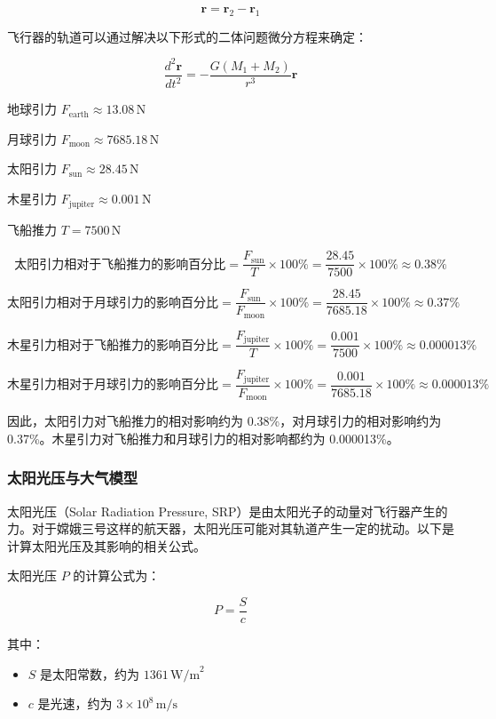 \documentclass{ctexart}
\begin{document}
\[
\mathbf{r} = \mathbf{r}_2 - \mathbf{r}_1
\]

飞行器的轨道可以通过解决以下形式的二体问题微分方程来确定：

\[
\frac{d^2 \mathbf{r}}{dt^2} = -\frac{G (M_1 + M_2)}{r^3} \mathbf{r}
\]

地球引力 \( F_{\text{earth}} \approx 13.08 \, \text{N} \)

月球引力 \( F_{\text{moon}} \approx 7685.18 \, \text{N} \)

太阳引力 \( F_{\text{sun}} \approx 28.45 \, \text{N} \)

木星引力 \( F_{\text{jupiter}} \approx 0.001 \, \text{N} \)

飞船推力 \( T = 7500 \, \text{N} \)

\[
\text{太阳引力相对于飞船推力的影响百分比} = \frac{F_{\text{sun}}}{T} \times 100\% = \frac{28.45}{7500} \times 100\% \approx 0.38\%
\]

\[
\text{太阳引力相对于月球引力的影响百分比} = \frac{F_{\text{sun}}}{F_{\text{moon}}} \times 100\% = \frac{28.45}{7685.18} \times 100\% \approx 0.37\%
\]

\[
\text{木星引力相对于飞船推力的影响百分比} = \frac{F_{\text{jupiter}}}{T} \times 100\% = \frac{0.001}{7500} \times 100\% \approx 0.000013\%
\]

\[
\text{木星引力相对于月球引力的影响百分比} = \frac{F_{\text{jupiter}}}{F_{\text{moon}}} \times 100\% = \frac{0.001}{7685.18} \times 100\% \approx 0.000013\%
\]

因此，太阳引力对飞船推力的相对影响约为 0.38\%，对月球引力的相对影响约为 0.37\%。木星引力对飞船推力和月球引力的相对影响都约为 0.000013\%。

\subsubsection{太阳光压与大气模型}
太阳光压（Solar Radiation Pressure, SRP）是由太阳光子的动量对飞行器产生的力。对于嫦娥三号这样的航天器，太阳光压可能对其轨道产生一定的扰动。以下是计算太阳光压及其影响的相关公式。


太阳光压 \( P \) 的计算公式为：

\[
P = \frac{S}{c}
\]

其中：
\begin{itemize}
    \item \( S \) 是太阳常数，约为 \( 1361 \, \text{W/m}^2 \)
    \item \( c \) 是光速，约为 \( 3 \times 10^8 \, \text{m/s} \)
\end{itemize}
\end{document}
